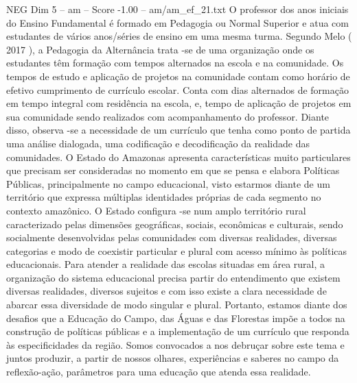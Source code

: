 \begin{textsample}{NEG Dim 5 – am – Score -1.00 – am/am\_ef\_21.txt}
O professor dos anos iniciais do Ensino Fundamental é formado em Pedagogia ou Normal Superior e atua com estudantes de vários anos/séries de ensino em uma mesma turma.
Segundo Melo ( 2017 ), a Pedagogia da Alternância trata -se de uma organização onde os estudantes têm formação com tempos alternados na escola e na comunidade.
Os tempos de estudo e aplicação de projetos na comunidade contam como horário de efetivo cumprimento de currículo escolar.
Conta com dias alternados de formação em tempo integral com residência na escola, e, tempo de aplicação de projetos em sua comunidade sendo realizados com acompanhamento do professor.
Diante disso, observa -se a necessidade de um currículo que tenha como ponto de partida uma análise dialogada, uma codificação e decodificação da realidade das comunidades.
O Estado do Amazonas apresenta características muito particulares que precisam ser consideradas no momento em que se pensa e elabora Políticas Públicas, principalmente no campo educacional, visto estarmos diante de um território que expressa múltiplas identidades próprias de cada segmento no contexto amazônico.
O Estado configura -se num amplo território rural caracterizado pelas dimensões geográficas, sociais, econômicas e culturais, sendo socialmente desenvolvidas pelas comunidades com diversas realidades, diversas categorias e modo de coexistir particular e plural com acesso mínimo às políticas educacionais.
Para atender a realidade das escolas situadas em área rural, a organização do sistema educacional precisa partir do entendimento que existem diversas realidades, diversos sujeitos e com isso existe a clara necessidade de abarcar essa diversidade de modo singular e plural.
Portanto, estamos diante dos desafios que a Educação do Campo, das Águas e das Florestas impõe a todos na construção de políticas públicas e a implementação de um currículo que responda às especificidades da região.
Somos convocados a nos debruçar sobre este tema e juntos produzir, a partir de nossos olhares, experiências e saberes no campo da reflexão-ação, parâmetros para uma educação que atenda essa realidade.

\end{textsample}
